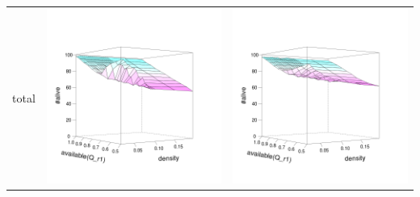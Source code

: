 \documentclass[a4paper,10pt]{article}
\begin{document}
\begin{table}[H]
\begin{tabular}{lcc}
total & \includegraphics[width=\imgSize]{images/active_median}&\includegraphics[width=\imgSize]{images/active_mean}
\end{tabular}

\end{table}
\end{document}
